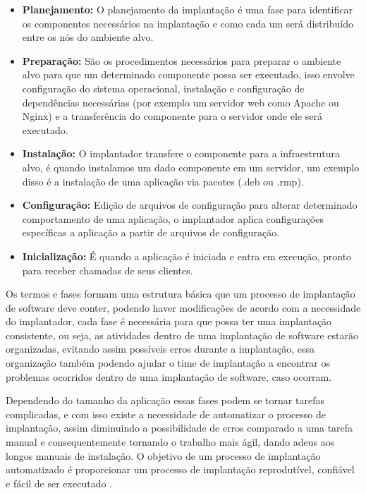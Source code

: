 \begin{itemize}
  \item  \textbf{Planejamento:} O planejamento da implantação é uma fase
  para identificar os componentes necessários na implantação e como cada um será
  distribuído entre os nós do ambiente alvo.
  \item  \textbf{Preparação:} São os procedimentos necessários para preparar o
  ambiente alvo para que um determinado componente possa ser executado, isso envolve
  configuração do sistema operacional, instalação e configuração de dependências
  necessárias (por exemplo um servidor web como Apache ou Nginx) e a transferência
  do componente para o servidor onde ele será executado.
  \item  \textbf{Instalação:} O implantador transfere o componente para a infraestrutura
  alvo, é quando instalamos um dado componente em um servidor, um exemplo disso
  é a instalação de uma aplicação via pacotes (.deb ou .rmp).
  \item  \textbf{Configuração:} Edição de arquivos de configuração para alterar
  determinado comportamento de uma aplicação, o implantador aplica configurações
  específicas a aplicação a partir de arquivos de configuração.
  \item  \textbf{Inicialização:} É quando a aplicação é iniciada e entra em execução,
  pronto para receber chamadas de seus clientes.
\end{itemize}

Os termos e fases formam uma estrutura básica que um processo de implantação de software
deve conter, podendo haver modificações de acordo com a necessidade do implantador,
cada fase é necessária para que possa ter uma implantação consistente, ou seja, as
atividades dentro de uma implantação de software estarão organizadas, evitando assim
possíveis erros durante a implantação, essa organização também podendo ajudar o
time de implantação a encontrar os problemas ocorridos dentro de uma implantação
de software, caso ocorram.

Dependendo do tamanho da aplicação essas fases podem se tornar tarefas complicadas,
e com isso existe a necessidade de automatizar o processo de implantação, assim
diminuindo a possibilidade de erros comparado a uma tarefa manual e consequentemente
tornando o trabalho mais ágil, dando adeus aos longos manuais de instalação. 
O objetivo de um processo de implantação automatizado é proporcionar um processo
 de implantação reprodutível, confiável e fácil de ser executado \cite{humble2010}.

